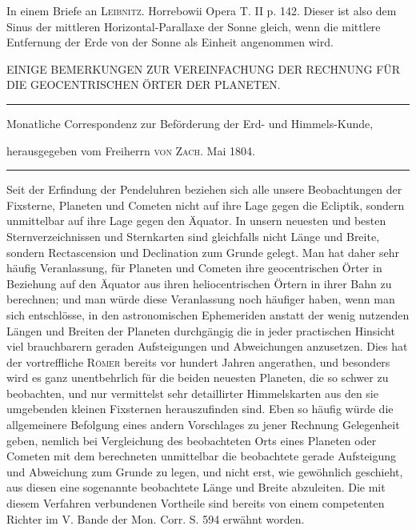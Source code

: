 \expandafter\def\csname HistoricalNoteText4\endcsname{In einem Briefe an \textsc{Leibnitz}. Horrebowii Opera T. II p. 142.}
\expandafter\def\csname HistoricalNoteText5\endcsname{Dieser ist also dem Sinus der mittleren Horizontal-Parallaxe der Sonne gleich, wenn die mittlere
Entfernung der Erde von der Sonne als Einheit angenommen wird.}
\clearpage{}%
\begin{center}
{\small EINIGE BEMERKUNGEN ZUR VEREINFACHUNG DER RECHNUNG
FÜR DIE GEOCENTRISCHEN ÖRTER DER PLANETEN.\par}
\medskip\hrule\medskip
{\small Monatliche Correspondenz zur Beförderung der Erd- und Himmels-Kunde,\par
herausgegeben vom Freiherrn \textsc{von Zach}. Mai 1804.\par}
\medskip\hrule
\end{center}\medskip
Seit der Erfindung der Pendeluhren beziehen sich alle unsere Beobachtungen
der Fixsterne, Planeten und Cometen nicht auf ihre Lage gegen die Ecliptik,
sondern unmittelbar auf ihre Lage gegen den Äquator. In unsern neuesten
und besten Sternverzeichnissen und Sternkarten sind gleichfalls nicht Länge und
Breite, sondern Rectascension und Declination zum Grunde gelegt. Man hat
daher sehr häufig Veranlassung, für Planeten und Cometen ihre geocentrischen
Örter in Beziehung auf den Äquator aus ihren heliocentrischen Örtern in ihrer
Bahn zu berechnen; und man würde diese Veranlassung noch häufiger haben,
wenn man sich entschlösse, in den astronomischen Ephemeriden anstatt der wenig
nutzenden Längen und Breiten der Planeten durchgängig die in jeder practischen
Hinsicht viel brauchbarern geraden Aufsteigungen und Abweichungen anzusetzen.
Dies hat der vortreffliche \textsc{Römer} bereits vor hundert Jahren angerathen,
und besonders wird es ganz unentbehrlich für die beiden neuesten Planeten,
die so schwer zu beobachten, und nur vermittelst sehr detaillirter Himmelskarten
aus den sie umgebenden kleinen Fixsternen herauszufinden sind. Eben
so häufig würde die allgemeinere Befolgung eines andern Vorschlages zu jener
Rechnung Gelegenheit geben, nemlich bei Vergleichung des beobachteten Orts
%
eines Planeten oder Cometen mit dem berechneten unmittelbar die beobachtete
gerade Aufsteigung und Abweichung zum Grunde zu legen, und nicht erst, wie
gewöhnlich geschieht, aus diesen eine sogenannte beobachtete Länge und Breite
abzuleiten. Die mit diesem Verfahren verbundenen Vortheile sind bereits von
einem competenten Richter im V. Bande der Mon. Corr. S. 594 erwähnt worden.

